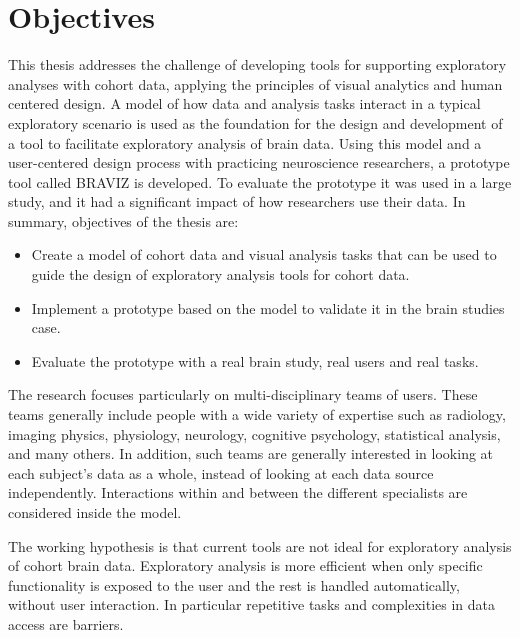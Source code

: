 
\section{Objectives}

This thesis addresses the challenge of developing tools for supporting exploratory analyses with cohort data, applying the principles of visual analytics and human centered design. A model of how data and analysis tasks interact in a typical exploratory scenario is used as the foundation for the design and development of a tool to facilitate exploratory analysis of brain data. Using this model and a user-centered design process with practicing neuroscience researchers, a prototype tool called BRAVIZ is developed. To evaluate the prototype it was used in a large study, and it had a significant impact of how researchers use their data. In summary, objectives of the thesis are:

\begin{itemize}
\item Create a model of cohort data and visual analysis tasks that can be used to guide the design of exploratory analysis tools for cohort data.

\item Implement a prototype based on the model to validate it in the brain studies case.

\item Evaluate the prototype with a real brain study, real users and real tasks.

\end{itemize}

The research focuses particularly on multi-disciplinary teams of users. These teams generally include people with a wide variety of expertise such as radiology, imaging physics, physiology, neurology, cognitive psychology, statistical analysis, and many others. In addition, such teams are generally interested in looking at each subject's data as a whole, instead of looking at each data source independently. Interactions within and between the different specialists are considered inside the model.

The working hypothesis is that  current tools are not ideal for exploratory analysis of cohort brain data. Exploratory analysis is more efficient when only specific functionality is exposed to the user and the rest is handled automatically, without user interaction. In particular repetitive tasks and complexities in data access are barriers.

